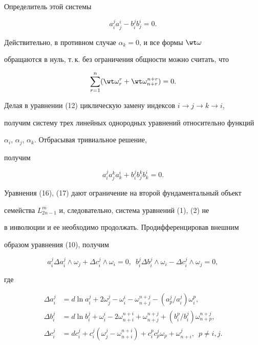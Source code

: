 Определитель этой системы 


\begin{equation} 


a^j_i a^i_j-b^j_i b^i_j=0. 


\end{equation} 


Действительно, в противном случае $\alpha_k=0$, и все формы $\wt\omega$ 


обращаются в нуль, т.\,к. без ограничения общности можно считать, что 


$$ 


\sum^n_{r=1}(\wt\omega^r_r+\wt\omega^{n+r}_{n+r})=0. 


$$ 


 


Делая в уравнении (12) циклическую замену индексов $i\to j\to k\to i$, 


получим систему трех линейных однородных уравнений относительно функций 


$\alpha_i$, $\alpha_j$, $\alpha_k$. Отбрасывая тривиальное решение, 


получим 


\begin{equation} 


a^j_i a^k_j a^i_k+b^j_i b^k_j b^i_k=0. 


\end{equation} 


 


Уравнения (16), (17) дают ограничение на второй фундаментальный объект 


семейства $L^m_{2n-1}$ и, следовательно, система уравнений (1), (2) не 


в инволюции и ее необходимо продолжать. Продифференцировав внешним 


образом уравнения (10), получим 


$$ 


a^j_i\Delta a^j_i\wedge\omega_j+\Delta c^j_i\wedge\omega_i=0,\ \; 


b^j_i\Delta b^j_i\wedge\omega_i-\Delta c^j_i\wedge\omega_j=0, 


$$ 


где 


\begin{align*} 


\Delta a^j_i&=d\ln a^j_i+2\omega^j_j-\omega^i_i- 


\omega^{n+j}_{n+j}-(a^j_p/a^j_i)\omega^p_i,\\ 


% 


\Delta b^j_i&=d\ln b^j_i+\omega^i_i-2\omega^{n+i}_{n+i}+ 


\omega^{n+j}_{n+j}+(b^p_i/b^j_i)\omega^{n+j}_{n+p},\\ 


% 


\Delta c^j_i&=d c^j_i+c^j_i(\omega^j_j-\omega^{n+i}_{n+i}) 


+c^p_i c^j_p\omega_p+\omega^j_{n+i},\ \; p\ne i,j. 


\end{align*} 


